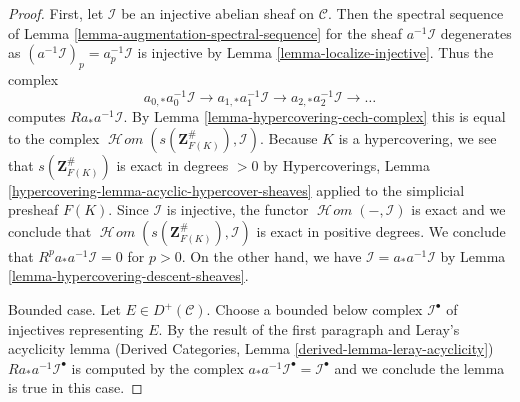 \documentclass{stacks-project}
\theoremstyle{plain}
\theoremstyle{definition}
\theoremstyle{remark}
\numberwithin{equation}{subsection}
\def\SheafHom{\mathop{\mathcal{H}\!\mathit{om}}\nolimits}
\begin{document}
\begin{proof}
First, let $\mathcal{I}$ be an injective abelian sheaf on $\mathcal{C}$.
Then the spectral sequence of
Lemma \ref{lemma-augmentation-spectral-sequence}
for the sheaf $a^{-1}\mathcal{I}$ degenerates as
$(a^{-1}\mathcal{I})_p = a_p^{-1}\mathcal{I}$
is injective by Lemma \ref{lemma-localize-injective}.
Thus the complex
$$
a_{0, *}a_0^{-1}\mathcal{I} \to
a_{1, *}a_1^{-1}\mathcal{I} \to
a_{2, *}a_2^{-1}\mathcal{I} \to\ldots
$$
computes $Ra_*a^{-1}\mathcal{I}$. By
Lemma \ref{lemma-hypercovering-cech-complex}
this is equal to the complex
$\SheafHom(s(\mathbf{Z}_{F(K)}^\#), \mathcal{I})$.
Because $K$ is a hypercovering, we see that
$s(\mathbf{Z}_{F(K)}^\#)$ is exact in degrees $> 0$ by
Hypercoverings, Lemma \ref{hypercovering-lemma-acyclic-hypercover-sheaves}
applied to the simplicial presheaf $F(K)$.
Since $\mathcal{I}$ is injective, the functor $\SheafHom(-, \mathcal{I})$
is exact and we conclude that
$\SheafHom(s(\mathbf{Z}_{F(K)}^\#), \mathcal{I})$
is exact in positive degrees. We conclude that
$R^pa_*a^{-1}\mathcal{I} = 0$ for $p > 0$.
On the other hand, we have $\mathcal{I} = a_*a^{-1}\mathcal{I}$
by Lemma \ref{lemma-hypercovering-descent-sheaves}.

\medskip\noindent
Bounded case. Let $E \in D^+(\mathcal{C})$.
Choose a bounded below complex $\mathcal{I}^\bullet$ of injectives
representing $E$. By the result of the first paragraph and
Leray's acyclicity lemma
(Derived Categories, Lemma \ref{derived-lemma-leray-acyclicity})
$Ra_*a^{-1}\mathcal{I}^\bullet$
is computed by the complex
$a_*a^{-1}\mathcal{I}^\bullet = \mathcal{I}^\bullet$
and we conclude the lemma is true in this case.


\end{proof}
\end{document}

